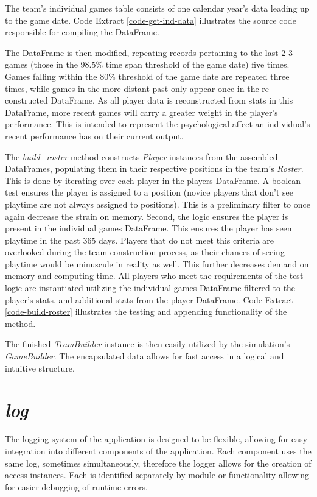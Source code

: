 \documentclass{thesis-ekf}
\theoremstyle{definition}
\theoremstyle{remark}
\begin{document}
The team's individual games table consists of one calendar year's data leading up to the game date. Code Extract \ref{code-get-ind-data} illustrates the source code responsible for compiling the DataFrame.

The DataFrame is then modified, repeating records pertaining to the last 2-3 games (those in the 98.5\% time span threshold of the game date) five times. Games falling within the 80\% threshold of the game date are repeated three times, while games in the more distant past only appear once in the re-constructed DataFrame. As all player data is reconstructed from stats in this DataFrame, more recent games will carry a greater weight in the player's performance. This is intended to represent the psychological affect an individual's recent performance has on their current output.

The \emph{build\_roster} method constructs \emph{Player} instances from the assembled DataFrames, populating them in their respective positions in the team's \emph{Roster}. This is done by iterating over each player in the players DataFrame. A boolean test ensures the player is assigned to a position (novice players that don't see playtime are not always assigned to positions). This is a preliminary filter to once again decrease the strain on memory. Second, the logic ensures the player is present in the individual games DataFrame. This ensures the player has seen playtime in the past 365 days. Players that do not meet this criteria are overlooked during the team construction process, as their chances of seeing playtime would be minuscule in reality as well. This further decreases demand on memory and computing time. All players who meet the requirements of the test logic are instantiated utilizing the individual games DataFrame filtered to the player's stats, and additional stats from the player DataFrame. Code Extract \ref{code-build-roster} illustrates the testing and appending functionality of the method.

The finished \emph{TeamBuilder} instance is then easily utilized by the simulation's \emph{GameBuilder}. The encapsulated data allows for fast access in a logical and intuitive structure.

\section{\emph{log}}
The logging system of the application is designed to be flexible, allowing for easy integration into different components of the application. Each component uses the same log, sometimes simultaneously, therefore the logger allows for the creation of access instances. Each is identified separately by module or functionality allowing for easier debugging of runtime errors. 
\end{document}
